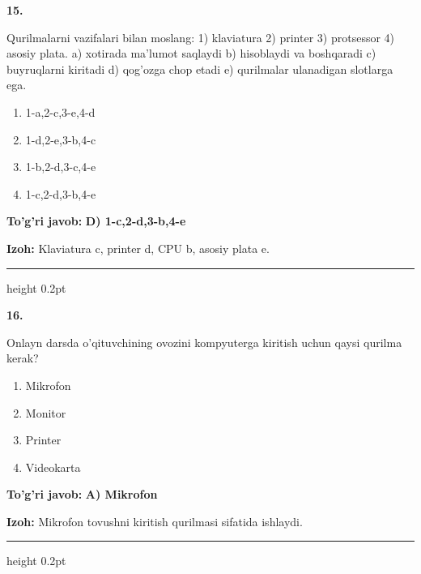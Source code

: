 \documentclass[10pt,a4paper]{article}
\begin{document}
{\bfseries\sffamily\color{ink} 15.}
\par
Qurilmalarni vazifalari bilan moslang: 1) klaviatura 2) printer 3) protsessor 4) asosiy plata. a) xotirada ma'lumot saqlaydi b) hisoblaydi va boshqaradi c) buyruqlarni kiritadi d) qog'ozga chop etadi e) qurilmalar ulanadigan slotlarga ega.
\begin{enumerate}[label=\Alph*),leftmargin=9mm]
\item 1-a,2-c,3-e,4-d
\item 1-d,2-e,3-b,4-c
\item 1-b,2-d,3-c,4-e
\item 1-c,2-d,3-b,4-e
\end{enumerate}
\begin{tcolorbox}[enhanced,breakable,colback=teal!4,colframe=teal!60!black,boxrule=0.45pt,arc=1.2mm,left=2.7mm,right=2.7mm,top=1.8mm,bottom=1.8mm,before skip=2mm,after skip=2mm]
{\bfseries\sffamily\color{teal}To'g'ri javob:} \textbf{D) 1-c,2-d,3-b,4-e}
\par\smallskip
{\bfseries Izoh:} Klaviatura c, printer d, CPU b, asosiy plata e.
\end{tcolorbox}
\vspace{2mm}\hrule height 0.2pt\vspace{3mm}

{\bfseries\sffamily\color{ink} 16.}
\par
Onlayn darsda o'qituvchining ovozini kompyuterga kiritish uchun qaysi qurilma kerak?
\begin{enumerate}[label=\Alph*),leftmargin=9mm]
\item Mikrofon
\item Monitor
\item Printer
\item Videokarta
\end{enumerate}
\begin{tcolorbox}[enhanced,breakable,colback=teal!4,colframe=teal!60!black,boxrule=0.45pt,arc=1.2mm,left=2.7mm,right=2.7mm,top=1.8mm,bottom=1.8mm,before skip=2mm,after skip=2mm]
{\bfseries\sffamily\color{teal}To'g'ri javob:} \textbf{A) Mikrofon}
\par\smallskip
{\bfseries Izoh:} Mikrofon tovushni kiritish qurilmasi sifatida ishlaydi.
\end{tcolorbox}
\vspace{2mm}\hrule height 0.2pt\vspace{3mm}
\end{document}

